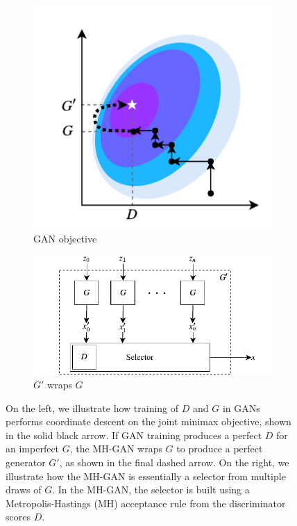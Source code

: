 \documentclass{article}
\begin{document}
\begin{figure}[bhtp]
    \centering
    \begin{subfigure}[t]{2.25in}
       \centering
       \includegraphics[scale=1.0]{figures/coord_descent.pdf}
       \caption{GAN objective}
    \end{subfigure}
    \hfill
    \begin{subfigure}[t]{3in}
       \centering
       \includegraphics[scale=1.0]{figures/block_diag.pdf}
       \caption{$G'$ wraps $G$}
    \end{subfigure}
    \caption{{\small
    On the left, we illustrate how training of $D$ and $G$ in GANs performs coordinate descent on the joint minimax objective, shown in the solid black arrow.
    If GAN training produces a perfect $D$ for an imperfect $G$, the MH-GAN wraps $G$ to produce a perfect generator $G'$, as shown in the final dashed arrow.
    On the right, we illustrate how the MH-GAN is essentially a selector from multiple draws of $G$.
    In the MH-GAN, the selector is built using a Metropolis-Hastings (MH) acceptance rule from the discriminator scores $D$.
    }}
    \label{fig:block_diag}
\end{figure}
\end{document}
